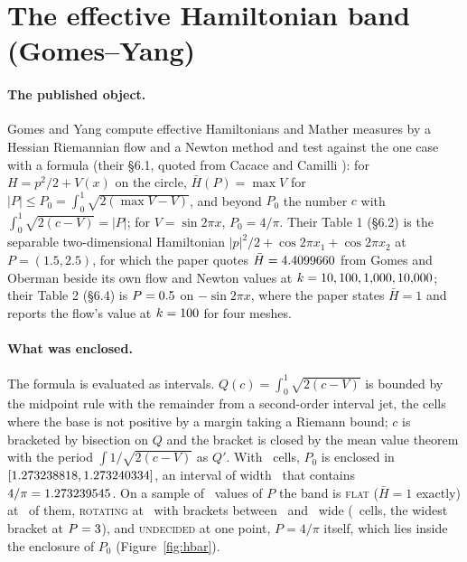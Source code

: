 \documentclass[11pt]{article}
\begin{document}
\section{The effective Hamiltonian band (Gomes--Yang)}\label{sec:hbar}

\paragraph{The published object.} Gomes and Yang \cite{GY20} compute effective Hamiltonians and Mather measures by a Hessian Riemannian flow and a Newton method and test against the one case with a formula (their \S6.1, quoted from Cacace and Camilli \cite{CC16}): for $H = p^2/2 + V(x)$ on the circle, $\bar H(P) = \max V$ for $|P| \le P_0 = \int_0^1\sqrt{2(\max V - V)}$, and beyond $P_0$ the number $c$ with $\int_0^1\sqrt{2(c - V)} = |P|$; for $V = \sin 2\pi x$, $P_0 = 4/\pi$. Their Table 1 (\S6.2) is the separable two-dimensional Hamiltonian $|p|^2/2 + \cos 2\pi x_1 + \cos 2\pi x_2$ at $P = (1.5, 2.5)$, for which the paper quotes $\bar H = 4.4099660$ from Gomes and Oberman \cite{GO04} beside its own flow and Newton values at $k = 10, 100, 1{,}000, 10{,}000$; their Table 2 (\S6.4) is $P = 0.5$ on $-\sin 2\pi x$, where the paper states $\bar H = 1$ and reports the flow's value at $k = 100$ for four meshes.

\paragraph{What was enclosed.} The formula is evaluated as intervals. $Q(c) = \int_0^1\sqrt{2(c - V)}$ is bounded by the midpoint rule with the remainder from a second-order interval jet, the cells where the base is not positive by a margin taking a Riemann bound; $c$ is bracketed by bisection on $Q$ and the bracket is closed by the mean value theorem with the period $\int 1/\sqrt{2(c - V)}$ as $Q'$. With \HBKPZero\ cells, $P_0$ is enclosed in $[1.273238818, 1.273240334]$, an interval of width \HBPZeroWidth\ that contains $4/\pi = 1.273239545$. On a sample of \HBSampled\ values of $P$ the band is \textsc{flat} ($\bar H = 1$ exactly) at \HBFlat\ of them, \textsc{rotating} at \HBRotating\ with brackets between \HBWidthMin\ and \HBWidthMax\ wide (\HBKSweep\ cells, the widest bracket at $P = 3$), and \textsc{undecided} at one point, $P = 4/\pi$ itself, which lies inside the enclosure of $P_0$ (Figure~\ref{fig:hbar}).
\begingroup\sloppy
\end{document}
